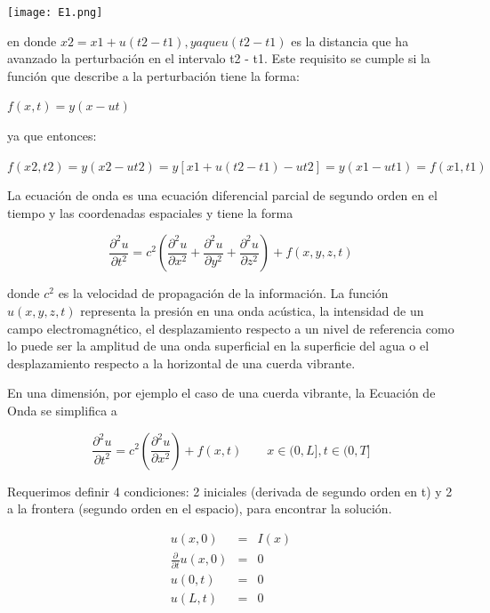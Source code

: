 \documentclass[12pt]{article}
\begin{document}
\begin{center}
    \texttt{[image: E1.png]}
\end{center}

en donde $x2 = x1 + u(t2 - t1), ya que u(t2 - t1)$ es la distancia que ha avanzado la
perturbación en el intervalo t2 - t1. Este requisito se cumple si la función que
describe a la perturbación tiene la forma:

\begin{center}
    $f(x,t) = y(x - ut) $
    
    ya que entonces:
    
    $f(x2,t2) = y(x2 - ut2) = y[x1 + u(t2 - t1)- ut2] = y( x1 - ut1) = f(x1,t1)$
    
\end{center}

La ecuación de onda es una ecuación diferencial parcial de segundo orden en el tiempo y las coordenadas espaciales y tiene la forma

\begin{equation*}
\frac{\partial^2 u}{\partial t^2} = c^2 \left( 
  \frac{\partial^2 u}{\partial x^2} +
  \frac{\partial^2 u}{\partial y^2} +
  \frac{\partial^2 u}{\partial z^2} \right) + f(x,y,z,t)
\end{equation*}

donde $c^{2}$ es la velocidad de propagación de la información. La función $u(x,y,z,t)$ representa la presión en una onda acústica, la intensidad de un campo electromagnético, el desplazamiento respecto a un nivel de referencia como lo puede ser la amplitud de una onda superficial en la superficie del agua o el desplazamiento respecto a la horizontal de una cuerda vibrante. 

En una dimensión, por ejemplo el caso de una cuerda vibrante, la Ecuación de Onda se simplifica a 

\begin{equation*}
\frac{\partial^2 u}{\partial t^2} = c^2 \left( 
  \frac{\partial^2 u}{\partial x^2}
   \right) + f(x,t) \qquad x \in (0,L], t \in (0,T]
\end{equation*}

Requerimos definir 4 condiciones: 2 iniciales (derivada de segundo orden en t) y 2 a la frontera (segundo orden en el espacio), para encontrar la solución.

\begin{eqnarray*}
u(x,0) & = & I(x) \\
\frac{\partial}{\partial t} u(x,0) & = & 0 \\
u(0,t) & = & 0 \\
u(L,t) & = & 0 \\
\end{eqnarray*}
\end{document}
